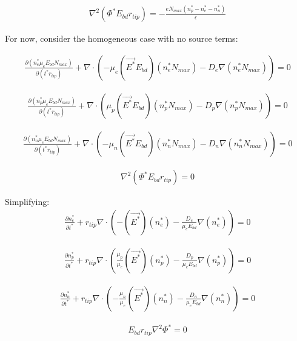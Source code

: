 \documentclass[12pt, a4paper]{report}
\begin{document}
\begin{align*}
    \nabla^2(\Phi^*E_{bd}r_{tip}) = -\frac{eN_{max}(n_p^*-n_e^*-n_n^*)}{\epsilon}
\end{align*}


\noindent
For now, consider the homogeneous case with no source terms:

\begin{align*}
        \frac{\partial (n_e^* \mu_e E_{bd} N_{max})}{\partial (t^*r_{tip})} + \nabla \cdot (-\mu_e(\vec{E^*}E_{bd})(n_e^*N_{max}) - D_e\nabla (n_e^*N_{max})) = 0
\end{align*}



\begin{align*}
    \frac{\partial (n_p^* \mu_e E_{bd} N_{max})}{\partial (t^*r_{tip})} + \nabla \cdot (\mu_p(\vec{E^*}E_{bd})(n_p^*N_{max}) - D_p\nabla (n_p^*N_{max})) = 0
\end{align*}




\begin{align*}
    \frac{\partial (n_n^* \mu_e E_{bd} N_{max})}{\partial (t^*r_{tip})} + \nabla \cdot (-\mu_n(\vec{E^*}E_{bd})(n_n^*N_{max}) - D_n\nabla (n_n^*N_{max})) = 0
\end{align*}

\begin{align*}
    \nabla^2(\Phi^*E_{bd}r_{tip}) = 0
\end{align*}

\noindent
Simplifying:
\begin{align*}
        \frac{\partial n_e^* }{\partial t^*} + r_{tip} \nabla \cdot \left(-(\vec{E^*})(n_e^*) - \frac{{D_e}}{\mu_e E_{bd}}\nabla (n_e^*)\right) = 0
\end{align*}

\begin{align*}
    \frac{\partial n_p^*}{\partial t^*} + r_{tip}\nabla \cdot \left(\frac{\mu_p}{\mu_e}(\vec{E^*})(n_p^*) - \frac{D_p}{\mu_eE_{bd}}\nabla (n_p^*)\right) = 0
\end{align*}


\begin{align*}
    \frac{\partial n_n^*}{\partial t^*} + r_{tip}\nabla \cdot \left(-\frac{\mu_n}{\mu_e}(\vec{E^*})(n_n^*) - \frac{D_n}{\mu_e E_{bd}}\nabla (n_n^*)\right) = 0
\end{align*}


\begin{align*}
    E_{bd}r_{tip}\nabla^2\Phi^* = 0
\end{align*}
\end{document}
